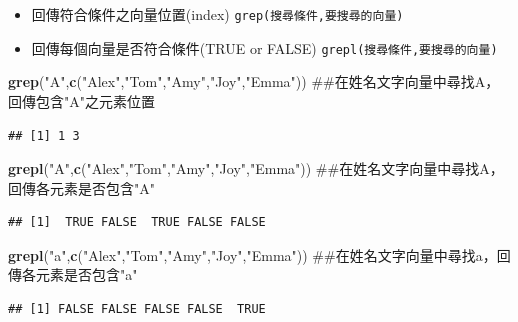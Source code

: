 \documentclass[]{book}
\newenvironment{Shaded}{\begin{snugshade}}{\end{snugshade}}
\newcommand{\KeywordTok}[1]{\textcolor[rgb]{0.13,0.29,0.53}{\textbf{{#1}}}}
\newcommand{\StringTok}[1]{\textcolor[rgb]{0.31,0.60,0.02}{{#1}}}
\newcommand{\NormalTok}[1]{{#1}}
\providecommand{\tightlist}{%
  \setlength{\itemsep}{0pt}\setlength{\parskip}{0pt}}
\theoremstyle{definition}
\theoremstyle{definition}
\theoremstyle{remark}
\begin{document}
\begin{itemize}
\tightlist
\item
  回傳符合條件之向量位置(index) \texttt{grep(搜尋條件,要搜尋的向量)}
\item
  回傳每個向量是否符合條件(TRUE or FALSE)
  \texttt{grepl(搜尋條件,要搜尋的向量)}
\end{itemize}

\begin{Shaded}
\begin{Highlighting}[]
\KeywordTok{grep}\NormalTok{(}\StringTok{"A"}\NormalTok{,}\KeywordTok{c}\NormalTok{(}\StringTok{"Alex"}\NormalTok{,}\StringTok{"Tom"}\NormalTok{,}\StringTok{"Amy"}\NormalTok{,}\StringTok{"Joy"}\NormalTok{,}\StringTok{"Emma"}\NormalTok{)) ##在姓名文字向量中尋找A，回傳包含"A"之元素位置}
\end{Highlighting}
\end{Shaded}

\begin{verbatim}
## [1] 1 3
\end{verbatim}

\begin{Shaded}
\begin{Highlighting}[]
\KeywordTok{grepl}\NormalTok{(}\StringTok{"A"}\NormalTok{,}\KeywordTok{c}\NormalTok{(}\StringTok{"Alex"}\NormalTok{,}\StringTok{"Tom"}\NormalTok{,}\StringTok{"Amy"}\NormalTok{,}\StringTok{"Joy"}\NormalTok{,}\StringTok{"Emma"}\NormalTok{)) ##在姓名文字向量中尋找A，回傳各元素是否包含"A"}
\end{Highlighting}
\end{Shaded}

\begin{verbatim}
## [1]  TRUE FALSE  TRUE FALSE FALSE
\end{verbatim}

\begin{Shaded}
\begin{Highlighting}[]
\KeywordTok{grepl}\NormalTok{(}\StringTok{"a"}\NormalTok{,}\KeywordTok{c}\NormalTok{(}\StringTok{"Alex"}\NormalTok{,}\StringTok{"Tom"}\NormalTok{,}\StringTok{"Amy"}\NormalTok{,}\StringTok{"Joy"}\NormalTok{,}\StringTok{"Emma"}\NormalTok{)) ##在姓名文字向量中尋找a，回傳各元素是否包含"a"}
\end{Highlighting}
\end{Shaded}

\begin{verbatim}
## [1] FALSE FALSE FALSE FALSE  TRUE
\end{verbatim}
\end{document}
